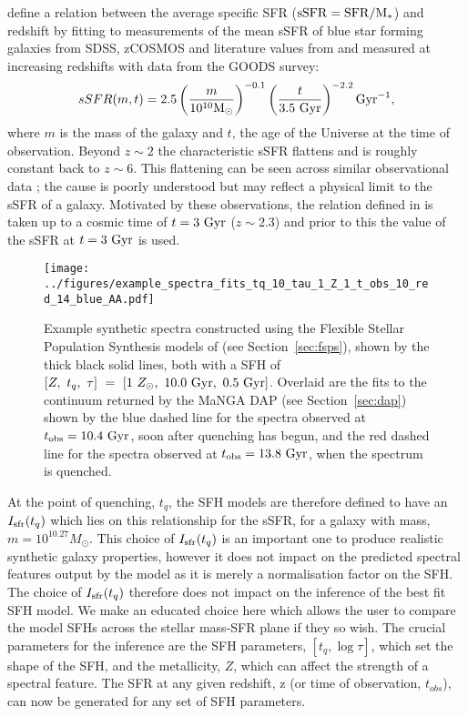 \documentclass[useAMS,usenatbib]{mn2e}
\begin{document}
\citet[][Equation 1]{peng10} define a relation between the average specific SFR ($\rm{sSFR}=SFR/M_*$) and redshift by fitting to measurements of the mean sSFR of blue star forming galaxies from SDSS, zCOSMOS and literature values from \cite{elbaz07} and \cite{daddi07} measured at increasing redshifts with data from the GOODS survey:
\begin{equation}\label{eq:peng}
sSFR(m,t) = 2.5 \left( \frac{m}{10^{10} \rm{M}_{\odot}} \right)^{-0.1} \left(\frac{t}{3.5 ~\rm{Gyr}}\right)^{-2.2} \rm{Gyr}^{-1},
\end{equation}
where $m$ is the mass of the galaxy and $t$, the age of the Universe at the time of observation. Beyond $z \sim 2$ the characteristic sSFR flattens and is roughly constant back to $z\sim6$. This flattening can be seen across similar observational data \citep{peng10, gonzalez10, bethermin12}; the cause is poorly understood but may reflect a physical limit to the sSFR of a galaxy. Motivated by these observations, the relation defined in \citet{peng10} is taken up to a cosmic time of $t=3~\rm{Gyr}$ ($z \sim 2.3$) and prior to this the value of the sSFR at $t=3~\rm{Gyr}$ is used. 

\begin{figure*}
\centering
\texttt{[image: ../figures/example\_spectra\_fits\_tq\_10\_tau\_1\_Z\_1\_t\_obs\_10\_red\_14\_blue\_AA.pdf]}
\caption{Example synthetic spectra constructed using the Flexible Stellar Population Synthesis models of \citeauthor[][]{conroy09} (see Section~\ref{sec:fsps}), shown by the thick black solid lines, both with a SFH of $[Z,~t_q,~\tau]~=~[1~Z_{\odot},~10.0~\rm{Gyr},~0.5~\rm{Gyr}]$. Overlaid are the fits to the continuum returned by the MaNGA DAP (see Section~\ref{sec:dap}) shown by the blue dashed line for the spectra observed at $t_{\rm{obs}} = 10.4~\rm{Gyr}$, soon after quenching has begun, and the red dashed line for the spectra observed at $t_{\rm{obs}} = 13.8~\rm{Gyr}$, when the spectrum is quenched.}
\label{fig:spectrafit}
\end{figure*}


At the point of quenching, $t_{q}$, the SFH models are therefore defined to have an $I_{\rm{sfr}}(t_q)$ which lies on this relationship for the sSFR, for a galaxy with mass, $m = 10^{10.27} M_{\odot}$. This choice of $I_{\rm{sfr}}(t_q)$ is an important one to produce realistic synthetic galaxy properties, however it does not impact on the predicted spectral features output by the model as it is merely a normalisation factor on the SFH. The choice of $I_{\rm{sfr}}(t_q)$ therefore does not impact on the inference of the best fit SFH model. We make an educated choice here which allows the user to compare the model SFHs across the stellar mass-SFR plane if they so wish. The crucial parameters for the inference are the SFH parameters, $[t_q, \log \tau]$, which set the shape of the SFH, and the metallicity, $Z$, which can affect the strength of a spectral feature. The SFR at any given redshift, z (or time of observation, $t_{obs}$), can now be generated for any set of SFH parameters.
\end{document}
